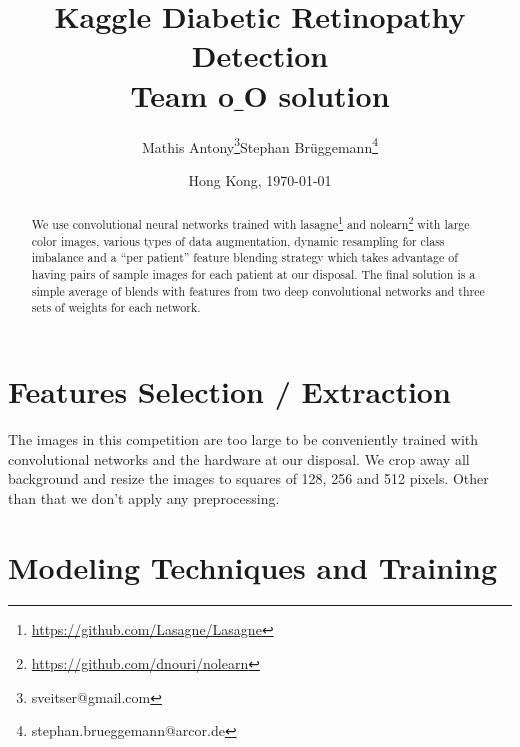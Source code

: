 \documentclass[12pt,a4paper]{scrartcl}
\title{Kaggle Diabetic Retinopathy Detection\\Team o$\_$O solution}
\author{Mathis Antony\thanks{sveitser@gmail.com}\quad Stephan Brüggemann\thanks{stephan.brueggemann@arcor.de}}
\date{Hong Kong, \today}
\begin{document}
\maketitle

\begin{abstract}
We use convolutional neural networks trained with lasagne\footnote{\url{https://github.com/Lasagne/Lasagne}} and nolearn\footnote{\url{https://github.com/dnouri/nolearn}} with large color images, various types of data augmentation, dynamic resampling for class imbalance and a ``per patient'' feature blending strategy which takes advantage of having pairs of sample images for each patient at our disposal. The final solution is a simple average of blends with features from two deep convolutional networks and three sets of weights for each network.
\end{abstract}

\section{Features Selection / Extraction}
The images in this competition are too large to be conveniently trained with convolutional networks and the hardware at our disposal. We crop away all background and resize the images to squares of 128, 256 and 512 pixels. Other than that we don't apply any preprocessing.
\section{Modeling Techniques and Training}
\end{document}
